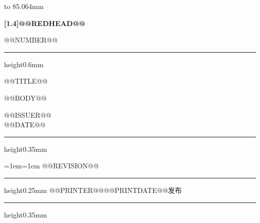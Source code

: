 \documentclass[UTF8,fontset=none,twoside]{ctexart}
\begin{document}
\fontsize{16pt}{30pt}\selectfont
\raggedright
\setlength{\parindent}{2em}
\noindent\vbox to 85.064mm{%
\vspace*{35mm}
{\centering\color{documentcolor}\titlefont\fontsize{36pt}{44pt}\selectfont\bfseries
\scalebox{1}[1.4]{@@REDHEAD@@}\par}
\vfill
{\centering @@NUMBER@@\par}
\vspace{4mm}
{\color{documentcolor}\hrule height0.6mm}}\par
\vspace{60pt}
{\centering\titlefont\fontsize{@@TITLEFONT@@pt}{@@BODYLINE@@pt}\selectfont @@TITLE@@\par}
\vspace{30pt}
\fontsize{@@BODYFONT@@pt}{@@BODYLINE@@pt}\selectfont
@@BODY@@
\par\vspace{30pt}
\begin{flushright}
@@ISSUER@@\hspace{2em}\\
@@DATE@@\hspace{2em}
\end{flushright}
\vspace{30pt}
\noindent\begin{minipage}{\textwidth}
\hrule height0.35mm
\vspace{2pt}
\fontsize{14pt}{28pt}\selectfont
\if\relax{}\relax\else
{\leftskip=1em\rightskip=1em @@REVISION@@\par}
\vspace{2pt}
\hrule height0.25mm
\vspace{2pt}
\fi
\hspace{1em}@@PRINTER@@\hfill @@PRINTDATE@@发布\hspace{1em}\par
\vspace{2pt}
\hrule height0.35mm
\end{minipage}
\end{document}
